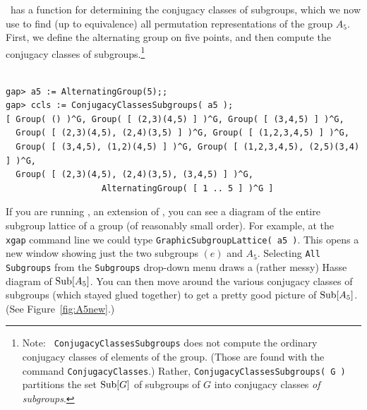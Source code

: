 \gap\ has a function for determining the conjugacy classes of
subgroups, which we now use to find (up to equivalence) all permutation
representations of the group $A_5$.
First, we define the alternating group on five points, and then
compute the conjugacy classes of subgroups.\footnote{Note: {\tt
    ConjugacyClassesSubgroups} does not compute the ordinary conjugacy classes of
  elements of the group. (Those are found with the command {\tt ConjugacyClasses}.)
  Rather, {\tt ConjugacyClassesSubgroups( G )} partitions the set $\operatorname{Sub}[G]$ of
  subgroups of $G$ into conjugacy classes \emph{of subgroups}.} 

{\codesize 
\begin{verbatim}

gap> a5 := AlternatingGroup(5);;
gap> ccls := ConjugacyClassesSubgroups( a5 );
[ Group( () )^G, Group( [ (2,3)(4,5) ] )^G, Group( [ (3,4,5) ] )^G, 
  Group( [ (2,3)(4,5), (2,4)(3,5) ] )^G, Group( [ (1,2,3,4,5) ] )^G, 
  Group( [ (3,4,5), (1,2)(4,5) ] )^G, Group( [ (1,2,3,4,5), (2,5)(3,4) ] )^G, 
  Group( [ (2,3)(4,5), (2,4)(3,5), (3,4,5) ] )^G, 
                   AlternatingGroup( [ 1 .. 5 ] )^G ]

\end{verbatim}}

\noindent If you are running \xgap, an extension of \gap, you can see a diagram of the entire
subgroup lattice of a group (of reasonably small order).  For example, at the {\tt
  xgap} command line we could type {\tt GraphicSubgroupLattice( a5 )}.  This opens a
new window showing just the two subgroups $(e)$ and $A_5$.  Selecting {\tt All
  Subgroups} from the {\tt Subgroups} drop-down menu draws a (rather messy) Hasse
diagram of $\operatorname{Sub}[A_5]$.  You can then move around the various conjugacy classes of
subgroups (which stayed glued together) to get a pretty good picture of
$\operatorname{Sub}[A_5]$. (See Figure~\ref{fig:A5new}.)

